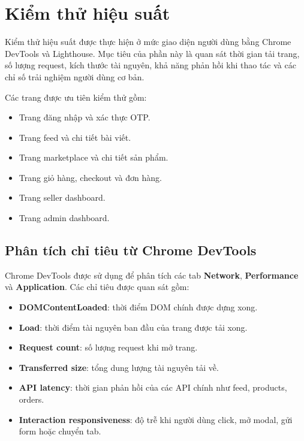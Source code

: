 \section{Kiểm thử hiệu suất}

Kiểm thử hiệu suất được thực hiện ở mức giao diện người dùng bằng Chrome DevTools và Lighthouse. Mục tiêu của phần này là quan sát thời gian tải trang, số lượng request, kích thước tài nguyên, khả năng phản hồi khi thao tác và các chỉ số trải nghiệm người dùng cơ bản.

Các trang được ưu tiên kiểm thử gồm:

\begin{itemize}
    \item Trang đăng nhập và xác thực OTP.
    \item Trang feed và chi tiết bài viết.
    \item Trang marketplace và chi tiết sản phẩm.
    \item Trang giỏ hàng, checkout và đơn hàng.
    \item Trang seller dashboard.
    \item Trang admin dashboard.
\end{itemize}

\subsection{Phân tích chỉ tiêu từ Chrome DevTools}

Chrome DevTools được sử dụng để phân tích các tab \textbf{Network}, \textbf{Performance} và \textbf{Application}. Các chỉ tiêu được quan sát gồm:

\begin{itemize}
    \item \textbf{DOMContentLoaded}: thời điểm DOM chính được dựng xong.
    \item \textbf{Load}: thời điểm tài nguyên ban đầu của trang được tải xong.
    \item \textbf{Request count}: số lượng request khi mở trang.
    \item \textbf{Transferred size}: tổng dung lượng tài nguyên tải về.
    \item \textbf{API latency}: thời gian phản hồi của các API chính như feed, products, orders.
    \item \textbf{Interaction responsiveness}: độ trễ khi người dùng click, mở modal, gửi form hoặc chuyển tab.
\end{itemize}

